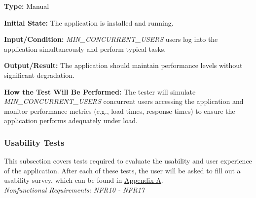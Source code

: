 \documentclass[12pt, titlepage]{article}
\begin{document}
\begin{enumerate}
\textbf{Type:} Manual
					
\textbf{Initial State:} The application is installed and running.
					
\textbf{Input/Condition:} \textit{MIN\_CONCURRENT\_USERS} users log into the
application simultaneously and perform typical tasks.
					
\textbf{Output/Result:} The application should maintain performance levels
without significant degradation.
					
\textbf{How the Test Will Be Performed:} The tester will simulate
\textit{MIN\_CONCURRENT\_USERS} concurrent users accessing the application and
monitor performance metrics (e.g., load times, response times) to ensure the
application performs adequately under load.

\end{enumerate}

\subsubsection{Usability Tests}

This subsection covers tests required to evaluate the usability and user
experience of the application. After each of these tests, the user will be asked
to fill out a usability survey, which can be found in \hyperref[appx.a]{Appendix
A}.\\

\textit{Nonfunctional Requirements: NFR10 - NFR17}
\end{document}
